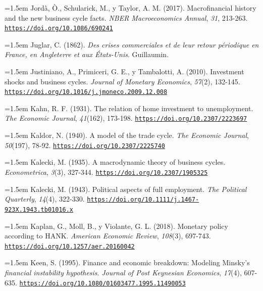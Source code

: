 \documentclass[10pt,a4paper]{article}
\begin{document}
\noindent\hangindent=1.5em Jordà, Ò., Schularick, M., y Taylor, A. M. (2017). Macrofinancial history and the new business cycle facts. \textit{NBER Macroeconomics Annual}, \textit{31}, 213-263. \href{https://doi.org/10.1086/690241}{\nolinkurl{https://doi.org/10.1086/690241}}

\noindent\hangindent=1.5em Juglar, C. (1862). \textit{Des crises commerciales et de leur retour périodique en France, en Angleterre et aux États-Unis}. Guillaumin.

\noindent\hangindent=1.5em Justiniano, A., Primiceri, G. E., y Tambalotti, A. (2010). Investment shocks and business cycles. \textit{Journal of Monetary Economics}, \textit{57}(2), 132-145. \href{https://doi.org/10.1016/j.jmoneco.2009.12.008}{\nolinkurl{https://doi.org/10.1016/j.jmoneco.2009.12.008}}

\noindent\hangindent=1.5em Kahn, R. F. (1931). The relation of home investment to unemployment. \textit{The Economic Journal}, \textit{41}(162), 173-198. \href{https://doi.org/10.2307/2223697}{\nolinkurl{https://doi.org/10.2307/2223697}}

\noindent\hangindent=1.5em Kaldor, N. (1940). A model of the trade cycle. \textit{The Economic Journal}, \textit{50}(197), 78-92. \href{https://doi.org/10.2307/2225740}{\nolinkurl{https://doi.org/10.2307/2225740}}

\noindent\hangindent=1.5em Kalecki, M. (1935). A macrodynamic theory of business cycles. \textit{Econometrica}, \textit{3}(3), 327-344. \href{https://doi.org/10.2307/1905325}{\nolinkurl{https://doi.org/10.2307/1905325}}

{\sloppy\noindent\hangindent=1.5em Kalecki, M. (1943). Political aspects of full employment. \textit{The Political Quarterly}, \textit{14}(4), 322-330. \href{https://doi.org/10.1111/j.1467-923X.1943.tb01016.x}{\nolinkurl{https://doi.org/10.1111/j.1467-923X.1943.tb01016.x}}\par}

\noindent\hangindent=1.5em Kaplan, G., Moll, B., y Violante, G. L. (2018). Monetary policy according to HANK. \textit{American Economic Review}, \textit{108}(3), 697-743. \href{https://doi.org/10.1257/aer.20160042}{\nolinkurl{https://doi.org/10.1257/aer.20160042}}

{\sloppy\noindent\hangindent=1.5em Keen, S. (1995). Finance and economic breakdown: Modeling Minsky's \textit{financial instability hypothesis}. \textit{Journal of Post Keynesian Economics}, \textit{17}(4), 607-635. \href{https://doi.org/10.1080/01603477.1995.11490053}{\nolinkurl{https://doi.org/10.1080/01603477.1995.11490053}}\par}
\end{document}
